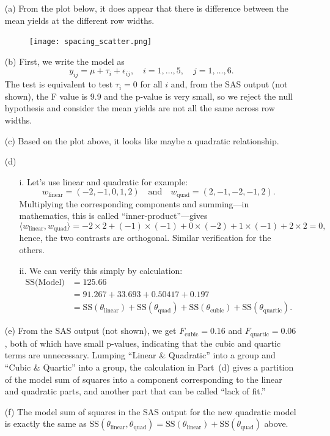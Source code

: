 \documentclass[a4paper, 12pt]{article}
\theoremstyle{plain}
\theoremstyle{definition}
\theoremstyle{remark}
\begin{document}
{\begin{itemize}
\item[(a)] From the plot below, it does appear that there is difference between the mean yields at the different row widths.
\begin{figure}[ht!]
\centering
\texttt{[image: spacing\_scatter.png]}
\end{figure}
\item[(b)] First, we write the model as 
\[ y_{ij}=\mu+\tau_i+\epsilon_{ij}, \quad i=1,\ldots,5, \quad j=1,\ldots,6. \] 
The test is equivalent to test $\tau_i=0$ for all $i$ and, from the SAS output (not shown), the F value is 9.9 and the p-value is very small, so we reject the null hypothesis and consider the mean yields are not all the same across row widths.
\item[(c)] Based on the plot above, it looks like maybe a quadratic relationship.  
\item[(d)]
\begin{itemize}
\item[i.] Let's use linear and quadratic for example: 
\[ w_{\text{linear}} = (-2, -1, 0, 1, 2) \quad \text{and} \quad w_{\text{quad}} = (2, -1, -2, -1, 2). \]
Multiplying the corresponding components and summing---in mathematics, this is called ``inner-product''---gives 
\[ \langle w_{\text{linear}}, w_{\text{quad}} \rangle = -2\times 2+(-1)\times(-1)+0\times(-2)+1\times(-1)+2\times2=0, \]
hence, the two contrasts are orthogonal.  Similar verification for the others.
\item[ii.] We can verify this simply by calculation:
\begin{align*}
\text{SS(Model)} & = 125.66 \\
& = 91.267+33.693+0.50417+0.197 \\
& = \text{SS}(\theta_{\text{linear}}) + \text{SS}(\theta_{\text{quad}}) + \text{SS}(\theta_{\text{cubic}}) + \text{SS}(\theta_{\text{quartic}}). 
\end{align*}
\end{itemize}
\item[(e)] From the SAS output (not shown), we get $F_{\text{cubic}} = 0.16$ and $F_{\text{quartic}} = 0.06$, both of which have small p-values, indicating that the cubic and quartic terms are unnecessary. Lumping ``Linear \& Quadratic'' into a group and ``Cubic \& Quartic'' into a group, the calculation in Part~(d) gives a partition of the model sum of squares into a component corresponding to the linear and quadratic parts, and another part that can be called ``lack of fit.''  
\item[(f)] The model sum of squares in the SAS output for the new quadratic model is exactly the same as $\text{SS}(\theta_{\text{linear}}, \theta_{\text{quad}}) = \text{SS}(\theta_{\text{linear}}) + \text{SS}(\theta_{\text{quad}})$ above.  
\end{itemize}

}
\end{document}
